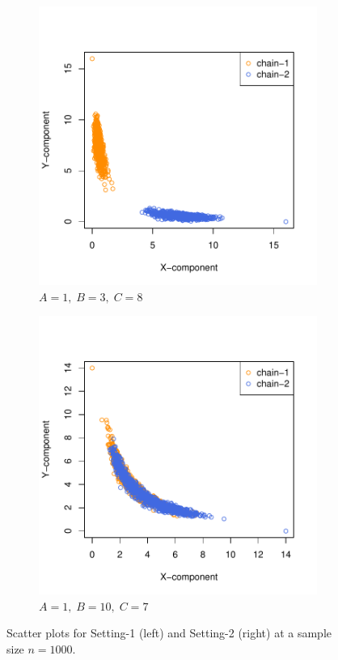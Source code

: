 \documentclass[11pt]{article}
\theoremstyle{remark}
\begin{document}
\begin{figure}[h]
    \centering
    \begin{subfigure}[h]{0.4\textwidth}
      \centering
      \includegraphics[width = \textwidth]{plots/boom-sp_1_3_8.pdf}
      \caption{$A = 1,\; B = 3, \; C = 8$}
      \label{subfig:boom-sp_1_3_8}
    \end{subfigure}
    \begin{subfigure}[h]{0.4\textwidth}
      \centering
      \includegraphics[width = \textwidth]{plots/boom-sp_1_10_7.pdf}
      \caption{$A = 1, \; B = 10, \; C = 7$}
      \label{subfig:boom-sp_1_10_7}
    \end{subfigure}
    \caption{Scatter plots for Setting-1 (left) and Setting-2 (right) at a sample size $n = 1000$.}
    \label{fig:boom-sp}
\end{figure}
\end{document}
